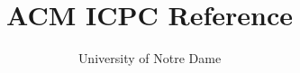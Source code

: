 \documentclass[a4paper,oneside]{article}
\title{ACM ICPC Reference}
\author{University of Notre Dame}
\begin{document}
\maketitle
\thispagestyle{fancy}
\tableofcontents
\newpage

\begin{lstlisting}

\end{lstlisting}


\end{document}
